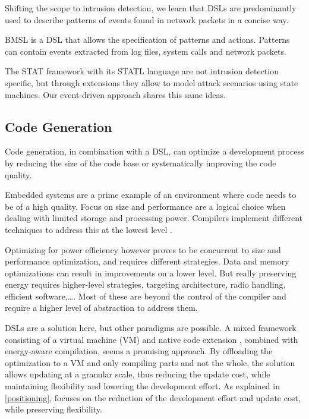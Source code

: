 \documentclass[conference]{IEEEtran}
\begin{document}
Shifting the scope to intrusion detection, we learn that DSLs are predominantly
used to describe patterns of events found in network
packets \cite{sekar1999high,roesch1999snort} in a concise way.

BMSL \cite{uppuluri2001experiences} is a DSL that allows the specification of
patterns and actions. Patterns can contain events extracted from log files,
system calls and network packets.

The STAT framework with its STATL
language \cite{eckmann2002statl,vigna2003designing} are not intrusion detection
specific, but through extensions they allow to model attack scenarios using
state machines. Our event-driven approach shares this same ideas.

\subsection{Code Generation}

Code generation, in combination with a DSL, can optimize a development process
by reducing the size of the code base or systematically improving the code
quality.

Embedded systems are a prime example of an environment where code needs to be
of a high quality. Focus on size and performance are a logical choice when
dealing with limited storage and processing power. Compilers implement
different techniques to address this at the lowest level \cite{leupers2000code,
marwedel2002code}.

Optimizing for power efficiency however proves to be concurrent to size and
performance optimization, and requires different strategies. Data and memory
optimizations \cite{panda2001data} can result in improvements on a lower level.
But really preserving energy requires higher-level strategies, targeting
architecture, radio handling, efficient software,\dots \cite{naik2001software}.
Most of these are beyond the control of the compiler and require a higher level
of abstraction to address them.

DSLs are a solution here, but other paradigms are possible. A mixed framework
consisting of a virtual machine (VM) and native code
extension \cite{sadilek2007energy}, combined with energy-aware compilation,
seems a promising approach. By offloading the optimization to a VM and only
compiling parts and not the whole, the solution allows updating at a granular
scale, thus reducing the update cost, while maintaining flexibility and
lowering the development effort. As explained in \ref{positioning}, \NAME
focuses on the reduction of the development effort and update cost, while
preserving flexibility.
\end{document}
